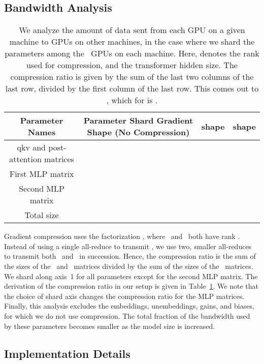 \documentclass{article}
\begin{document}
\subsection{Bandwidth Analysis}
\label{sec:dist_train_bw}
\begin{table}[]
    \centering\small
    \begin{tabular}{cccc}
        \toprule
         Parameter Names & Parameter Shard Gradient Shape (No Compression) &  shape &  shape \\
         \midrule
         qkv and post-attention matrices &  &  &  \\
         First MLP matrix &  &  &  \\
         Second MLP matrix &  &  &  \\
         Total size &  &  &  \\
         \bottomrule
    \end{tabular}
    \caption{We analyze the amount of data sent from each GPU on a given machine to GPUs on other machines, in the case where we shard the parameters among the~ GPUs on each machine. Here,  denotes the rank used for compression, and  the transformer hidden size. The compression ratio is given by the sum of the last two columns of the last row, divided by the first column of the last row. This comes out to , which for  is .}
    \label{tab:cmp_ratio}
\end{table}
Gradient compression uses the factorization , where~ and~ both have rank . Instead of using a single all-reduce to transmit , we use two, smaller all-reduces to transmit both~ and~ in succession. Hence, the compression ratio is the sum of the sizes of the~ and~ matrices divided by the sum of the sizes of the~ matrices. We shard along axis~1 for all parameters except for the second MLP matrix. The derivation of the compression ratio in our setup is given in Table~\ref{tab:cmp_ratio}. We note that the choice of shard axis changes the compression ratio for the MLP matrices. Finally, this analysis excludes the embeddings, unembeddings, gains, and biases, for which we do not use compression. The total fraction of the bandwidth used by these parameters becomes smaller as the model size is increased.

\subsection{Implementation Details}
\label{sec:dist_train_impl}
\end{document}
